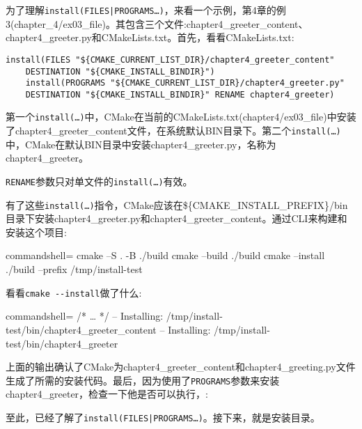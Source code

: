 为了理解\texttt{install(FILES|PROGRAMS…)}，来看一个示例，第4章的例3(chapter\_4/ex03\_file)。其包含三个文件:chapter4\_greeter\_content、chapter4\_greeter.py和CMakeLists.txt。首先，看看CMakeLists.txt:

\begin{lstlisting}[style=styleCMake]
install(FILES "${CMAKE_CURRENT_LIST_DIR}/chapter4_greeter_content"
	DESTINATION "${CMAKE_INSTALL_BINDIR}")
	install(PROGRAMS "${CMAKE_CURRENT_LIST_DIR}/chapter4_greeter.py"
	DESTINATION "${CMAKE_INSTALL_BINDIR}" RENAME chapter4_greeter)
\end{lstlisting}

第一个\texttt{install(…)}中，CMake在当前的CMakeLists.txt(chapter4/ex03\_file)中安装了chapter4\_greeter\_content文件，在系统默认BIN目录下。第二个\texttt{install(…)}中，CMake在默认BIN目录中安装chapter4\_greeter.py，名称为chapter4\_greeter。

\begin{tcolorbox}[colback=webgreen!5!white,colframe=webgreen!75!black,title=Note]
\texttt{RENAME}参数只对单文件的\texttt{install(…)}有效。
\end{tcolorbox}

有了这些\texttt{install(…)}指令，CMake应该在\$\{CMAKE\_INSTALL\_PREFIX\}/bin目录下安装chapter4\_greeter.py和chapter4\_greeter\_content。通过CLI来构建和安装这个项目:

\begin{tcblisting}{commandshell={}}
cmake –S . -B ./build
cmake --build ./build
cmake --install ./build --prefix /tmp/install-test
\end{tcblisting}

看看\texttt{cmake -{}-install}做了什么:

\begin{tcblisting}{commandshell={}}
/* … */
-- Installing: /tmp/install-test/bin/chapter4_greeter_content
-- Installing: /tmp/install-test/bin/chapter4_greeter
\end{tcblisting}

上面的输出确认了CMake为chapter4\_greeter\_content和chapter4\_greeting.py文件生成了所需的安装代码。最后，因为使用了\texttt{PROGRAMS}参数来安装chapter4\_greeter，检查一下他是否可以执行，:


至此，已经了解了\texttt{install(FILES|PROGRAMS…)}。接下来，就是安装目录。

